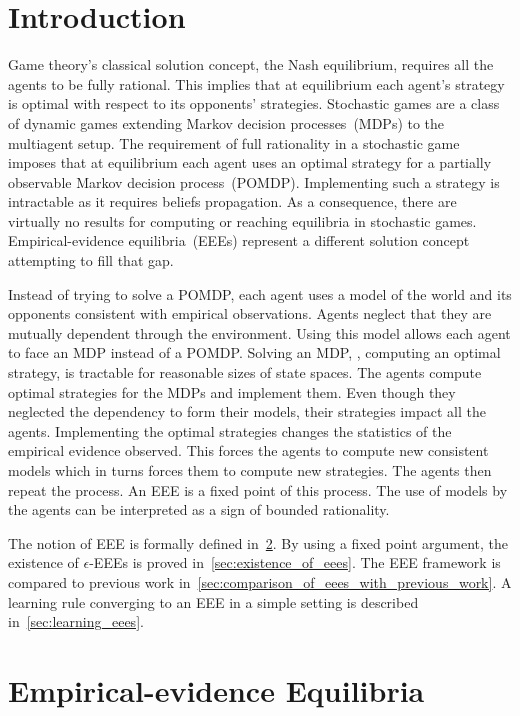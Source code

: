 \section{Introduction}


Game theory's classical solution concept, the Nash equilibrium, requires all the agents to be fully rational.
This implies that at equilibrium each agent's strategy is optimal with respect to its opponents' strategies.
Stochastic games are a class of dynamic games extending Markov decision processes~(MDPs) to the multiagent setup.
The requirement of full rationality in a stochastic game imposes that at equilibrium each agent uses an optimal strategy for a partially observable Markov decision process~(POMDP).
Implementing such a strategy is intractable as it requires beliefs propagation.
As a consequence, there are virtually no results for computing or reaching equilibria in stochastic games.
Empirical-evidence equilibria~(EEEs) represent a different solution concept attempting to fill that gap.

Instead of trying to solve a POMDP, each agent uses a model of the world and its opponents consistent with empirical observations.
Agents neglect that they are mutually dependent through the environment.
Using this model allows each agent to face an MDP instead of a POMDP.
Solving an MDP, \ie, computing an optimal strategy, is tractable for reasonable sizes of state spaces.
The agents compute optimal strategies for the MDPs and implement them.
Even though they neglected the dependency to form their models, their strategies impact all the agents.
Implementing the optimal strategies changes the statistics of the empirical evidence observed.
This forces the agents to compute new consistent models which in turns forces them to compute new strategies.
The agents then repeat the process.
An EEE is a fixed point of this process.
The use of models by the agents can be interpreted as a sign of bounded rationality.

The notion of EEE is formally defined in~\cref{sec:empirical_evidence_equilibria}.
By using a fixed point argument, the existence of \(\epsilon\)-EEEs is proved in~\cref{sec:existence_of_eees}.
The EEE framework is compared to previous work in~\cref{sec:comparison_of_eees_with_previous_work}.
A learning rule converging to an EEE in a simple setting is described in~\cref{sec:learning_eees}.


\section{Empirical-evidence Equilibria}
\label{sec:empirical_evidence_equilibria}


